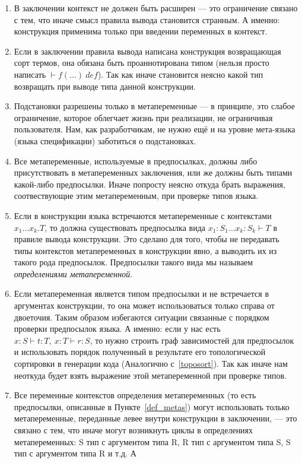 \begin{enumerate}
\item В заключении контекст не должен быть расширен --- это ограничение связано с тем, что иначе смысл правила вывода становится странным. А именно: конструкция применима только при введении переменных в контекст.

\item Если в заключении правила вывода написана конструкция возвращающая сорт термов, она обязана быть проаннотирована типом (нельзя просто написать $ \vdash f(\ldots)\ def$). Так как иначе становится неясно какой тип возвращать при выводе типа данной конструкции.

\item Подстановки разрешены только в метапеременные --- в принципе, это слабое ограничение, которое облегчает жизнь при реализации, не ограничивая пользователя. Нам, как разработчикам, не нужно ещё и на уровне мета-языка (языка спецификации) заботиться о подстановках.

\item \label{tm:Meta} Все метапеременные, используемые в предпосылках, должны либо присутствовать в метапеременных заключения, или же должны быть типами какой-либо предпосылки. Иначе попросту неясно откуда брать выражения, соотвествующие этим метапеременным, при проверке типов языка.

\item \label{def_metas} Если в конструкции языка встречаются метапеременные с контекстами $x_1 \ldots x_k . T$, то должна существовать предпосылка вида $x_1 : S_1 \ldots x_k : S_k  \vdash T$ в правиле вывода конструкции. Это сделано для того, чтобы не передавать типы контекстов метапеременных в конструкции явно, а выводить их из такого рода предпосылок. Предпосылки такого вида мы называем \textit{определениями метапеременной}.

\item \label{right::} Если метапеременная является типом предпосылки и не встречается в аргументах конструкции, то она может использоваться только справа от двоеточия. Таким образом избегаются ситуации связанные с порядком проверки предпосылок языка. А именно: если у нас есть $x : S \vdash t : T,\ x:T \vdash r : S$, то нужно строить граф зависимостей для предпосылок и использовать порядок полученный в результате его топологической сортировки в генерации кода (Аналогично с~\ref{toposort}). Так как иначе нам неоткуда будет взять выражение этой метапеременной при проверке типов.

\item \label{order:Meta} Все переменные контекстов определения метапеременных (то есть предпосылки, описанные в Пункте~\ref{def_metas}) могут использовать только метапеременные, переданные левее внутри конструкции в заключении, --- это связано с тем, что иначе могут возникнуть циклы в определениях метапеременных: S тип с аргументом типа R, R тип с аргументом типа S, S тип с аргументом типа R и т.д. А


\end{enumerate}
